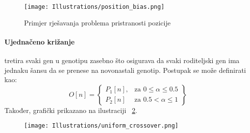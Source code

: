 \begin{figure}
	\texttt{[image: Illustrations/position\_bias.png]}
	\caption{Primjer rješavanja problema pristranosti pozicije}
	\label{fig:position_bias}
\end{figure}

\paragraph{Ujednačeno križanje}
tretira svaki gen u genotipu zasebno što osigurava da svaki roditeljski gen ima jednaku šansu da se prenese na novonastali genotip.
Postupak se može definirati kao:
\[
	O[n] = \left\{\begin{array}{lr}
			P_1[n], & \text{za } 0 \leq \alpha \leq 0.5 \\
			P_2[n] & \text{za } 0.5 < \alpha \leq 1
		\end{array}\right\}
\]
Također, grafički prikazano na ilustraciji ~\ref{fig:uniform_crossover}.

\begin{figure}
	\texttt{[image: Illustrations/uniform\_crossover.png]}
	\caption{}
	\label{fig:uniform_crossover}
\end{figure}
